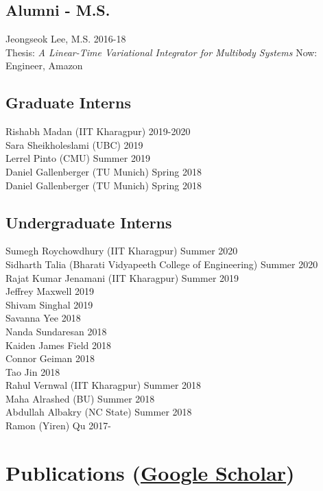 \documentclass[10pt]{article}
\begin{document}
\subsection{Alumni - M.S.}
\noindent
Jeongseok Lee, M.S. \hfill 2016-18\\
Thesis: \textit{A Linear-Time Variational Integrator for Multibody Systems}
\hfill Now: Engineer, Amazon\\

\subsection{Graduate Interns}
\noindent
Rishabh Madan (IIT Kharagpur) \hfill 2019-2020\\
Sara Sheikholeslami (UBC) \hfill 2019\\
Lerrel Pinto (CMU) \hfill Summer 2019\\
Daniel Gallenberger (TU Munich) \hfill Spring 2018\\
Daniel Gallenberger (TU Munich) \hfill Spring 2018\\

\subsection{Undergraduate Interns}
\noindent
Sumegh Roychowdhury (IIT Kharagpur) \hfill Summer 2020 \\
Sidharth Talia (Bharati Vidyapeeth College of Engineering) \hfill Summer 2020 \\
Rajat Kumar Jenamani (IIT Kharagpur) \hfill Summer 2019\\
Jeffrey Maxwell \hfill 2019\\
Shivam Singhal \hfill 2019\\
Savanna Yee \hfill 2018\\
Nanda Sundaresan \hfill 2018\\
Kaiden James Field \hfill 2018\\
Connor Geiman \hfill 2018\\
Tao Jin \hfill 2018	\\
Rahul Vernwal (IIT Kharagpur) \hfill Summer 2018\\
Maha Alrashed (BU) \hfill Summer 2018\\
Abdullah Albakry (NC State) \hfill Summer 2018\\
Ramon (Yiren) Qu \hfill 2017-\\


\section{Publications (\href{https://scholar.google.com/citations?user=RCi98EAAAAAJ&hl=en}{Google Scholar})}
\end{document}
